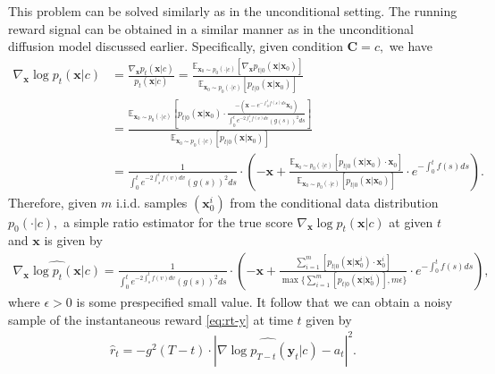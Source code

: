 \documentclass[11pt]{article}
\begin{document}
This problem can be solved similarly as in the unconditional setting.
The running reward signal can be obtained in a similar manner as in the unconditional diffusion model discussed earlier. Specifically, given condition $\mathbf{C} = c,$ we have
\begin{align*}%
\nabla_{\mathbf{x}}\log p_{t}(\mathbf{x}|c) & = \frac{ \nabla_{\mathbf{x}} p_{t}(\mathbf{x}|c)}{p_{t}(\mathbf{x}|c) } = \frac{\mathbb{E}_{\mathbf{x}_{0} \sim p_0(\cdot|c) } [  \nabla_{\mathbf{x}}  p_{t|0}(\mathbf{x} | \mathbf{x}_{0})]}{ \mathbb{E}_{\mathbf{x}_{0} \sim p_0(\cdot|c) } [ p_{t|0}(\mathbf{x} | \mathbf{x}_{0})] }  \nonumber \\
& = \frac{\mathbb{E}_{\mathbf{x}_{0} \sim p_0(\cdot|c) } \left[  p_{t|0}(\mathbf{x} | \mathbf{x}_{0})  \cdot  \frac{-( \mathbf{x}-e^{-\int_{0}^{t}f(s)ds}\mathbf{x}_{0}  ) }{ \int_{0}^{t}e^{-2\int_{s}^{t}f(v)dv}(g(s))^{2}ds} \right] }{ \mathbb{E}_{\mathbf{x}_{0} \sim p_0(\cdot|c) } [ p_{t|0}(\mathbf{x} | \mathbf{x}_{0})] } \nonumber \\
& = \frac{1} { \int_{0}^{t}e^{-2\int_{s}^{t}f(v)dv}(g(s))^{2}ds} \cdot \left( -  \mathbf{x} +  \frac{\mathbb{E}_{\mathbf{x}_{0} \sim p_0(\cdot|c) } \left[  p_{t|0}(\mathbf{x} | \mathbf{x}_{0})  \cdot  {\mathbf{x}_{0}  } \right] }{ \mathbb{E}_{\mathbf{x}_{0} \sim p_0(\cdot|c) } [ p_{t|0}(\mathbf{x} | \mathbf{x}_{0})] } \cdot e^{-\int_{0}^{t}f(s)ds}  \right).
\end{align*}
Therefore, given $m$ i.i.d. samples $( \mathbf{x}^{i}_{0} )$ from the conditional data distribution $p_0(\cdot |c),$
a simple ratio estimator for the true score $\nabla_{\mathbf{x}}\log p_{t}(\mathbf{x}|c) $ at given $t$ and $\mathbf{x}$ is given by
\begin{align*}%
\widehat{ \nabla_{\mathbf{x}}\log p_{t}(\mathbf{x} | c) }   = \frac{1} { \int_{0}^{t}e^{-2\int_{s}^{t}f(v)dv}(g(s))^{2}ds} \cdot \left( -  \mathbf{x} +  \frac{ \sum_{i=1}^m  \left[  p_{t|0}(\mathbf{x} | \mathbf{x}^{i}_{0})  \cdot  {\mathbf{x}^{i}_{0}  } \right] }{ \max\{ \sum_{i=1}^m  [ p_{t|0}(\mathbf{x} | \mathbf{x}^i_{0})], m \epsilon \} } \cdot e^{-\int_{0}^{t}f(s)ds}  \right),
\end{align*}
where $\epsilon>0$ is some prespecified small value. It  follow that we can obtain a noisy sample of the instantaneous reward \eqref{eq:rt-y} at time $t$ given by
\begin{align}\label{eq:sample-r-cont}
\hat r_t = -g^2(T-t) \cdot {|  \widehat{ \nabla\log p_{T- t}(\mathbf{y}_t |c) }  - a_t|^2}.
\end{align}
\end{document}
